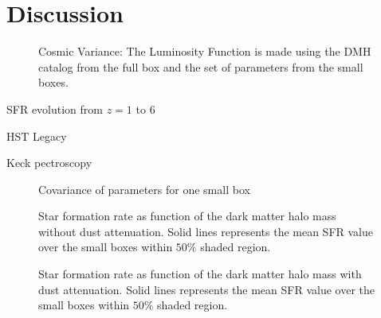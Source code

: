 \section{Discussion}

\begin{figure}
\caption{Cosmic Variance: The Luminosity Function is made using the DMH catalog 
from the full box and the set of parameters from the small boxes.}
\label{graph_cosmic_variance}
\end{figure}

\citep{lundgren14} SFR evolution from $z=1$ to $6$

\citep{bouwens14} HST Legacy

\citep{jiang11} Keck pectroscopy



\begin{figure}
\caption{Covariance of parameters for one small box}
\label{graph_scattering_plots}
\end{figure}




\begin{figure}
\caption{Star formation rate as function of the dark matter halo mass without dust attenuation. 
Solid lines represents the mean SFR value over the small boxes within $50\%$  shaded region. }
\label{graph_SFR_DMHM_wo}
\end{figure}

\begin{figure}
\caption{Star formation rate as function of the dark matter halo mass with dust attenuation. 
Solid lines represents the mean SFR value over the small boxes within $50\%$  shaded region. }
\label{graph_SFR_DMHM_w}
\end{figure}